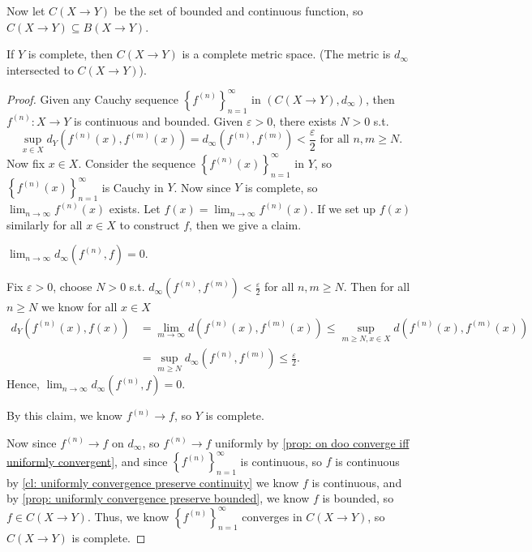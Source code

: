 Now let \(C(X \to Y)\) be the set of bounded and continuous function, so \(C(X \to Y) \subseteq B(X \to Y)\). 
\begin{theorem}
    If \(Y\) is complete, then \(C(X \to Y)\) is a complete metric space. (The metric is \(d_\infty \) intersected to \(C(X \to Y)\)).
\end{theorem}  
\begin{proof}
    Given any Cauchy sequence \(\left\{ f^{(n)} \right\}_{n=1}^{\infty}  \) in \(\left( C(X \to Y), d_\infty  \right) \), then \(f^{(n)}:X \to Y\) is continuous and bounded. Given \(\varepsilon > 0\), there exists \(N > 0\) s.t.  
    \[
        \sup _{x \in X} d_Y \left( f^{(n)}(x), f^{(m)}(x) \right)  = d_\infty \left( f^{(n)}, f^{(m)} \right) < \frac{\varepsilon}{2} \text{ for all } n, m \ge N.  
    \] Now fix \(x \in X\). Consider the sequence \(\left\{ f^{(n)}(x) \right\}_{n=1}^{\infty}  \) in \(Y\), so \(\left\{ f^{(n)}(x) \right\}_{n=1}^{\infty}  \) is Cauchy in \(Y\). Now since \(Y\) is complete, so \(\lim_{n \to \infty} f^{(n)}(x) \) exists. Let \(f(x) = \lim_{n \to \infty} f^{(n)}(x) \). If we set up \(f(x)\) similarly for all \(x \in X\) to construct \(f\), then we give a claim. 
    \begin{claim}
        \(\lim_{n \to \infty} d_\infty \left( f^{(n)}, f \right) = 0  \). 
    \end{claim}
    \begin{explanation}
        Fix \(\varepsilon > 0\), choose \(N > 0\) s.t. \(d_\infty \left( f^{(n)}, f^{(m)} \right) < \frac{\varepsilon}{2} \) for all \(n, m \ge N\). Then for all \(n \ge N\) we know for all \(x \in X\)  
        \begin{align*}
            d_Y \left( f^{(n)}(x), f(x) \right) &= \lim_{m \to \infty} d \left( f^{(n)}(x), f^{(m)}(x) \right) \le \sup _{m \ge N, x \in X} d \left( f^{(n)}(x), f^{(m)}(x) \right) \\
            &= \sup _{m \ge N} d_\infty \left( f^{(n)}, f^{(m)} \right) \le \frac{\varepsilon}{2}.     
        \end{align*}   
        Hence, \(\lim_{n \to \infty} d_\infty \left( f^{(n)}, f \right) = 0\).  
    \end{explanation}          
    By this claim, we know \(f^{(n)} \to f\), so \(Y\) is complete. 
    
    Now since \(f^{(n)} \to f\) on \(d_{\infty } \), so \(f^{(n)} \to f\) uniformly by \autoref{prop: on doo converge iff uniformly convergent}, and since \(\left\{ f^{(n)} \right\}_{n=1}^{\infty}  \) is continuous, so \(f\) is continuous by \autoref{cl: uniformly convergence preserve continuity} we know \(f\) is continuous, and by \autoref{prop: uniformly convergence preserve bounded}, we know \(f\) is bounded, so \(f \in C(X \to Y)\). Thus, we know \(\left\{ f^{(n)} \right\}_{n=1}^{\infty}  \) converges in \(C(X \to Y)\), so \(C(X \to Y)\) is complete.             
\end{proof}